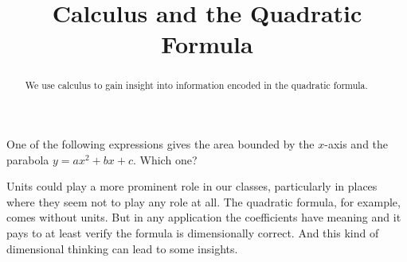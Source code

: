 \documentclass{ximera}
\title{Calculus and the Quadratic Formula}
\begin{document}
\begin{abstract}
We use calculus to gain insight into information encoded in the quadratic formula.
\end{abstract}
\maketitle

\begin{exercise}  
  One of the following expressions gives the area bounded by the $x$-axis and the parabola $y=ax^2+bx+c$. Which one?  
  \begin{multipleChoice}  
  \end{multipleChoice}  
\end{exercise}  

 
 
 



Units could play a more prominent role in our classes, particularly in places where they seem not to play any role at all. The quadratic formula, for example, comes without units. But in any application the coefficients have meaning and it pays to at least verify the formula is dimensionally correct. And this kind of dimensional thinking can lead to some insights. %
\end{document}
